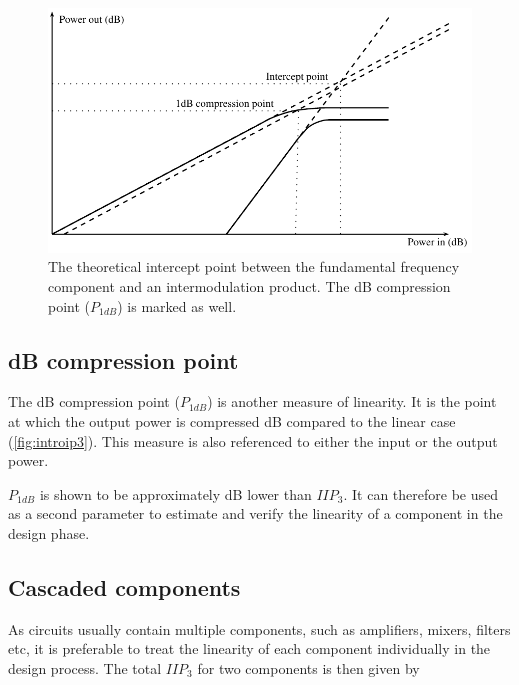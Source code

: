 			\begin{figure}[hbt!]
			\centering
			\includegraphics[width=1\textwidth]{fig/introduction/ip3.pdf}
			\caption[Definition of $n^{th}$-order intercept point and 1 dB compression point.]{The theoretical intercept point between the fundamental frequency component and an intermodulation product. The \unit[1]{dB} compression point ($P_{1dB}$) is marked as well.}\label{fig:introip3}
			\end{figure}
		
		\subsection{\unit[1]{dB} compression point}\label{sec:p1db}
			The \unit[1]{dB} compression point ($P_{1dB}$) is another measure of linearity. It is the point at which the output power is compressed \unit[1]{dB} compared to the linear case (\autoref{fig:introip3}). This measure is also referenced to either the input or the output power.

			$P_{1dB}$ is shown to be approximately \unit[10]{dB} lower than $IIP_3$.\autocite{kundert02} It can therefore be used as a second parameter to estimate and verify the linearity of a component in the design phase. %

		\subsection{Cascaded components}\label{sec:casc_iip3}
			As circuits usually contain multiple components, such as amplifiers, mixers, filters etc, it is preferable to treat the linearity of each component individually in the design process. The total $IIP_3$ for two components is then given by \autocite{pozar90}

